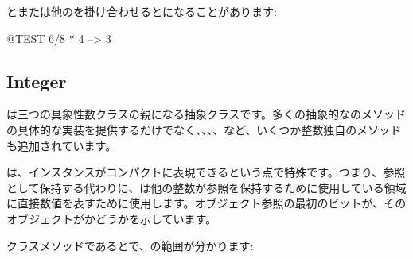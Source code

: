 \documentclass[a4paper,10pt,twoside]{book}
\begin{document}
とまたは他のを掛け合わせるとになることがあります:

\begin{code}{@TEST}
6/8 * 4 --> 3
\end{code}


\subsection{Integer}

は三つの具象性数クラスの親になる抽象クラスです。多くの抽象的なのメソッドの具体的な実装を提供するだけでなく、、、、など、いくつか整数独自のメソッドも追加されています。

は、インスタンスがコンパクトに表現できるという点で特殊です。つまり、参照として保持する代わりに、は他の整数が参照を保持するために使用している領域に直接数値を表すために使用します。オブジェクト参照の最初のビットが、そのオブジェクトがかどうかを示しています。

クラスメソッドであるとで、の範囲が分かります:
\end{document}
